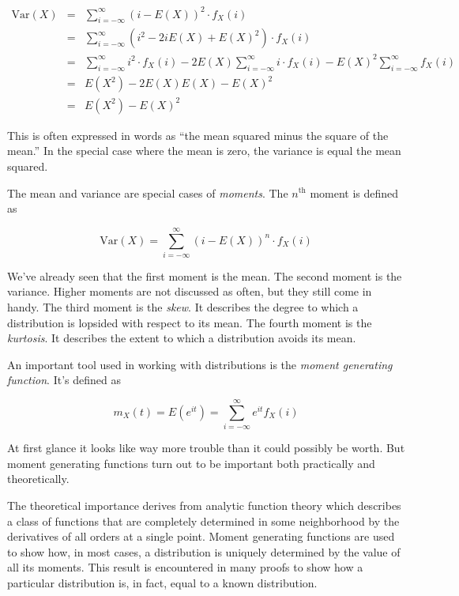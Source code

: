 \documentclass[]{article}
\begin{document}
\begin{eqnarray}
\mbox{Var}(X) & = & \sum_{i=-\infty}^{\infty} (i - E(X))^2 \cdot f_X(i) \nonumber \\
   & = & \sum_{i=-\infty}^{\infty} (i^2 - 2iE(X) + E(X)^2) \cdot f_X(i) \nonumber \\
   & = & \sum_{i=-\infty}^{\infty} i^2 \cdot f_X(i) 
       - 2E(X) \sum_{i=-\infty}^{\infty} i \cdot f_X(i)
       - E(X)^2 \sum_{i=-\infty}^{\infty} f_X(i) \nonumber \\
   & = & E(X^2) - 2E(X) E(X) - E(X)^2 \nonumber \\
   & = & E(X^2) - E(X)^2   \label{discrete_var2}
\end{eqnarray}

This is often expressed in words as ``the mean squared minus the
square of the mean.''  In the special case where the mean is zero,
the variance is equal the mean squared.

The mean and variance are special cases of \emph{moments}.
The $n^{\mbox{th}}$ moment is defined as

$$
\mbox{Var}(X) = \sum_{i = -\infty}^{\infty} (i - E(X))^n \cdot f_X(i)
$$

We've already seen that the first moment is the mean.
The second moment is the variance.  Higher moments are not
discussed as often, but they still come in handy.  The
third moment is the \emph{skew}.  It describes the degree
to which a distribution is lopsided with respect to its
mean.  The fourth moment is the \emph{kurtosis}.  It
describes the extent to which a distribution avoids its mean.

An important tool used in working with distributions is the
\emph{moment generating function}.  It's defined as

\begin{equation} \label{discrete_mgf}
m_X(t) = E(e^{it}) = \sum_{i=-\infty}^{\infty} e^{it} f_X(i)
\end{equation}

At first glance it looks like way more trouble than it could
possibly be worth.  But moment generating functions turn out
to be important both practically and theoretically.

The theoretical importance derives from analytic function
theory which describes a class of functions that are completely
determined in some neighborhood by the derivatives of all
orders at a single point.  Moment generating functions are
used to show how, in most cases, a distribution is uniquely
determined by the value of all its moments.  This result
is encountered in many proofs to show how a particular
distribution is, in fact, equal to a known distribution.
\end{document}
